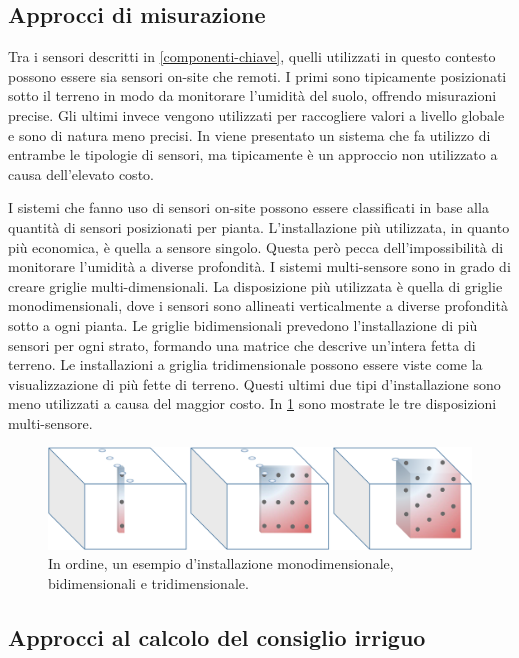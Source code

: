 \documentclass[12pt,a4paper,openright,twoside, openany]{book}
\begin{document}
\subsection{Approcci di misurazione}\label{approcci-misurazione}

Tra i sensori descritti in \cref{componenti-chiave}, quelli utilizzati in questo contesto possono essere sia sensori on-site che remoti.
I primi sono tipicamente posizionati sotto il terreno in modo da monitorare l'umidità del suolo, offrendo misurazioni precise.
Gli ultimi invece vengono utilizzati per raccogliere valori a livello globale e sono di natura meno precisi.
In \cite{Babaeian2021} viene presentato un sistema che fa utilizzo di entrambe le tipologie di sensori, ma tipicamente è un approccio non utilizzato a causa dell'elevato costo.

I sistemi che fanno uso di sensori on-site possono essere classificati in base alla quantità di sensori posizionati per pianta. L'installazione più utilizzata, in quanto più economica, è quella a sensore singolo. Questa però pecca dell'impossibilità di monitorare l'umidità a diverse profondità\cite{Arif2013}.
I sistemi multi-sensore sono in grado di creare griglie multi-dimensionali.
La disposizione più utilizzata è quella di griglie monodimensionali, dove i sensori sono allineati verticalmente a diverse profondità sotto a ogni pianta\cite{Karandish2016, Goldstein2017, Jimnez2020}.
Le griglie bidimensionali\cite{Egea2016, Cordeiro2016} prevedono l'installazione di più sensori per ogni strato, formando una matrice che descrive un'intera fetta di terreno.
Le installazioni a griglia tridimensionale\cite{ZapataSierra2021, Liang2021}  possono essere viste come la visualizzazione di più fette di terreno.
Questi ultimi due tipi d'installazione sono meno utilizzati a causa del maggior costo. In \cref{fig.griglie} sono mostrate le tre disposizioni multi-sensore.
\newpage
\begin{figure}[t]
    \centering\includegraphics[width=0.7\linewidth]{../figures/griglie.png}\caption{In ordine, un esempio d'installazione monodimensionale, bidimensionali e tridimensionale\cite{FRANCIA2022106924}.}\label{fig.griglie}
\end{figure}

\subsection{Approcci al calcolo del consiglio irriguo}\label{approcci-irrigazione}
\end{document}
